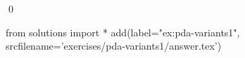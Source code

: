 
\begin{ex} 
  \label{ex:pda-variants1}
  
  \qed
\end{ex} 
\begin{python0}
from solutions import *
add(label="ex:pda-variants1",
    srcfilename='exercises/pda-variants1/answer.tex') 
\end{python0}
